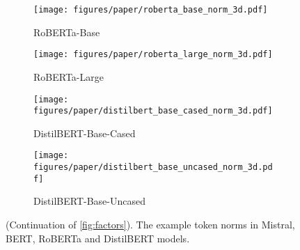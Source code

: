 \begin{figure}[t]
\begin{subfigure}[t]{0.24\linewidth}
        \texttt{[image: figures/paper/roberta\_base\_norm\_3d.pdf]}
        \caption{RoBERTa-Base}\label{fig:roberta_base_norm_3d}
    \end{subfigure}
    \begin{subfigure}[t]{0.24\linewidth}
        \texttt{[image: figures/paper/roberta\_large\_norm\_3d.pdf]}
        \caption{RoBERTa-Large}\label{fig:roberta_large_norm_3d}
    \end{subfigure}
    \begin{subfigure}[t]{0.24\linewidth}
        \texttt{[image: figures/paper/distilbert\_base\_cased\_norm\_3d.pdf]}
        \caption{DistilBERT-Base-Cased}\label{fig:distilbert_base_cased_norm_3d}
    \end{subfigure}
    \begin{subfigure}[t]{0.24\linewidth}
        \texttt{[image: figures/paper/distilbert\_base\_uncased\_norm\_3d.pdf]}
        \caption{DistilBERT-Base-Uncased}\label{fig:distilbert_base_uncased_norm_3d}
    \end{subfigure}
    \caption{(Continuation of \cref{fig:factors}).
    The example token norms in Mistral, BERT, RoBERTa and DistilBERT models.
    }\label{fig:more_bert}
\end{figure}


